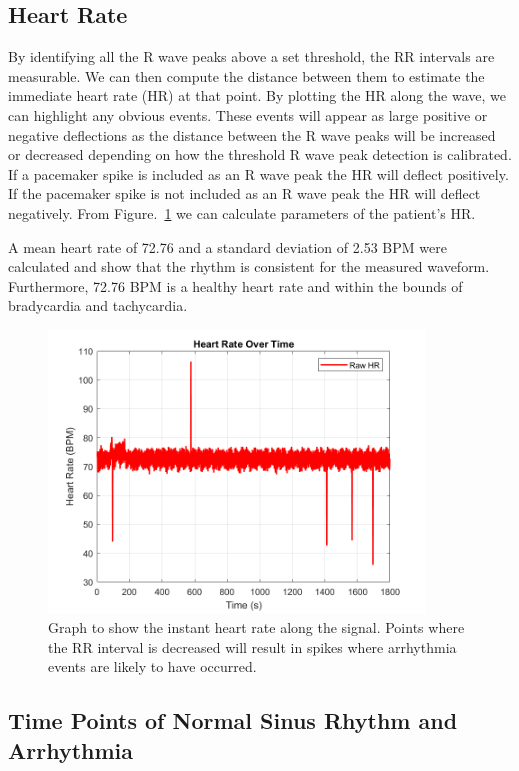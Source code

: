 \documentclass[conference]{IEEEtran}
\begin{document}
\subsection{Heart Rate}

By identifying all the R wave peaks above a set threshold, the RR intervals are measurable. We can then compute the distance between them to estimate the immediate heart rate (HR) at that point. By plotting the HR along the wave, we can highlight any obvious events. These events will appear as large positive or negative deflections as the distance between the R wave peaks will be increased or decreased depending on how the threshold R wave peak detection is calibrated. If a pacemaker spike is included as an R wave peak the HR will deflect positively. If the pacemaker spike is not included as an R wave peak the HR will deflect negatively. From Figure.~\ref{fig:HeartRate} we can calculate parameters of the patient's HR.

A mean heart rate of 72.76 and a standard deviation of 2.53 BPM were calculated and show that the rhythm is consistent for the measured waveform. Furthermore, 72.76 BPM is a healthy heart rate and within the bounds of bradycardia and tachycardia. 

\begin{figure}[h]
\centering
\includegraphics[width=10cm]{images/HR}
\caption{Graph to show the instant heart rate along the signal. Points where the RR interval is decreased will result in spikes where arrhythmia events are likely to have occurred.}
\label{fig:HeartRate}
\end{figure}

\subsection{Time Points of Normal Sinus Rhythm and Arrhythmia}
\end{document}
